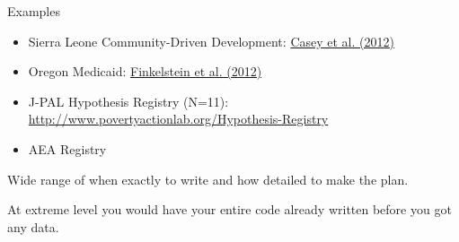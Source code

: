 \documentclass[aspectratio=169]{beamer}
\begin{document}

\begin{frame}{Examples}

\begin{itemize}[<.->]
\item
Sierra Leone Community-Driven Development: \href{http://qje.oxfordjournals.org/content/127/4/1755}{Casey et al. (2012)}
\item
Oregon Medicaid: \href{http://qje.oxfordjournals.org/content/127/3/1057}{Finkelstein et al. (2012)}
\item
J-PAL Hypothesis Registry (N=11): \url{http://www.povertyactionlab.org/Hypothesis-Registry}
\item
AEA Registry
\end{itemize} 
\vspace{0.25in}
Wide range of when exactly to write and how detailed to make the plan. 

\vspace{0.2in}
At extreme level you would have your entire code already written before you got any data.
\end{frame}
\end{document}
